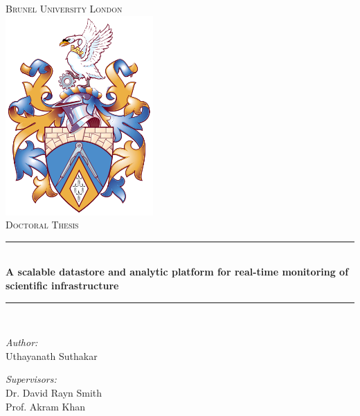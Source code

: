 \documentclass[oneside, a4paper, 11pt, ]{report}
\title{\title} %
\begin{document}
\fancyfoot[C]{\thepage}
\renewcommand{\headrulewidth}{0.4pt}
\newcommand{\HRule}{\rule{\linewidth}{0.5mm}} %



\begin{titlepage}
\begin{center}

\textsc{\LARGE Brunel University London}\\[0.5cm] %
\includegraphics[scale=0.5]{Figures/brunelshield.png} \\[0.5cm]
\textsc{\Large Doctoral Thesis}\\[0.5cm] %

\HRule \\[0.4cm] %
{\huge \bfseries A scalable datastore and analytic platform for real-time monitoring of scientific infrastructure}\\[0.3cm] 
\HRule \\[1.5cm] %
 
\begin{minipage}{0.4\textwidth}
\begin{flushleft} \large
\emph{Author:}\\
Uthayanath Suthakar 
\end{flushleft}
\end{minipage}
\begin{minipage}{0.4\textwidth}
\begin{flushright} \large
\emph{Supervisors:} \\
Dr. David Rayn Smith \\
Prof. Akram Khan
\end{flushright}
\end{minipage}\\[2cm]


\end{center}
\end{titlepage}
\end{document}
